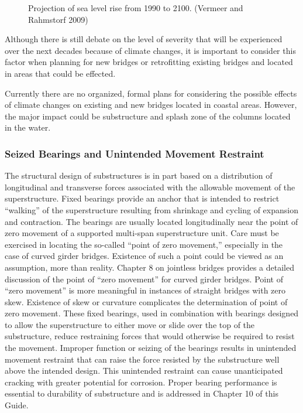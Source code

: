 \begin{figure}
  \caption{Projection of sea level rise from 1990 to 2100. (Vermeer and Rahmstorf 2009)}
  \label{fig:sea-level-rise-1990-2100}
\end{figure}

Although there is still debate on the level of severity that will be experienced over the next decades because of
climate changes, it is important to consider this factor when planning for new bridges or retrofitting existing bridges
and located in areas that could be effected.

Currently there are no organized, formal plans for considering the possible effects of climate changes on existing
and new bridges located in coastal areas. However, the major impact could be substructure and splash zone of the
columns located in the water.

\subsubsection{Seized Bearings and Unintended Movement Restraint}

The structural design of substructures is in part based on a distribution of longitudinal and transverse forces
associated with the allowable movement of the superstructure. Fixed bearings provide an anchor that is intended to restrict “walking” of the superstructure resulting from shrinkage and cycling of expansion and contraction. The
bearings are usually located longitudinally near the point of zero movement of a supported multi-span superstructure
unit. Care must be exercised in locating the so-called “point of zero movement,” especially in the case of curved
girder bridges. Existence of such a point could be viewed as an assumption, more than reality. Chapter 8 on jointless
bridges provides a detailed discussion of the point of “zero movement” for curved girder bridges. Point of “zero
movement” is more meaningful in instances of straight bridges with zero skew. Existence of skew or curvature
complicates the determination of point of zero movement. These fixed bearings, used in combination with bearings
designed to allow the superstructure to either move or slide over the top of the substructure, reduce restraining forces
that would otherwise be required to resist the movement. Improper function or seizing of the bearings results in
unintended movement restraint that can raise the force resisted by the substructure well above the intended design.
This unintended restraint can cause unanticipated cracking with greater potential for corrosion. Proper bearing
performance is essential to durability of substructure and is addressed in Chapter 10 of this Guide.

